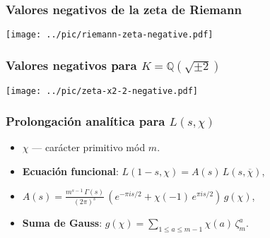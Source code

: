 \documentclass[handout]{beamer}
\newcommand{\QQ}{\mathbb{Q}}
\begin{document}

\begin{frame}
  \frametitle{Valores negativos de la zeta de Riemann}

  \begin{center}
    \texttt{[image: ../pic/riemann-zeta-negative.pdf]}
  \end{center}
\end{frame}


\begin{frame}
  \frametitle{Valores negativos para $K = \QQ (\sqrt{\pm 2})$}

  \begin{center}
    \texttt{[image: ../pic/zeta-x2-2-negative.pdf]}
  \end{center}
\end{frame}


\begin{frame}
  \frametitle{Prolongación analítica para $L (s,\chi)$}

  \begin{itemize}
  \item<1-> $\chi$ --- carácter primitivo mód $m$.

  \item<2-> \textbf{Ecuación funcional}: $L (1-s,\chi) = A(s) \, L (s,\overline{\chi})$,

  \item<3-> $A (s) = \frac{m^{s-1}\,\Gamma (s)}{(2\pi)^s} \, \left(e^{-\pi i s/2} + \chi (-1)\,e^{\pi i s/2}\right)\,g (\chi)$,

  \item<4-> \textbf{Suma de Gauss}: $g (\chi) = \sum\limits_{1 \le a \le m-1} \chi (a) \, \zeta_m^a$.
  \end{itemize}
\end{frame}

\end{document}

